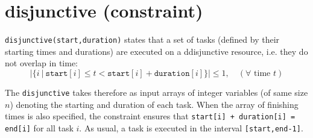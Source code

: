 \label{disjunctive}
\hypertarget{disjunctive}{}

\section{disjunctive (constraint)}\label{disjunctive:disjunctiveconstraint}\hypertarget{disjunctive:disjunctiveconstraint}{}

\begin{notedef}
  \texttt{disjunctive(start,duration)} states that a set of tasks (defined by their starting times and durations) are executed on a ddisjunctive resource, i.e. they do not overlap in time:
$$|\{i\ |\ \mathtt{start}[i]\le t < \mathtt{start}[i]+\mathtt{duration}[i]\}| \le 1,\quad (\forall \text{ time } t)$$
\end{notedef}

 The \texttt{disjunctive} takes therefore as input arrays of integer variables (of same size $n$) denoting the starting and duration of each task. When the array of finishing times is also specified, the constraint ensures that \texttt{start[i] + duration[i] = end[i]} for all task $i$.
As usual, a task is executed in the interval \texttt{[start,end-1]}.

